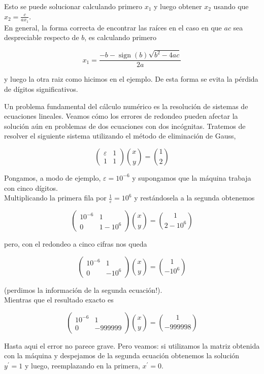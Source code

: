\documentclass[10pt]{book}
\begin{document}
Esto se puede solucionar calculando primero $x_{1}$ y luego obtener $x_{2}$ usando que $x_{2}=\frac{c}{a x_{1}}$.\\
En general, la forma correcta de encontrar las raíces en el caso en que $a c$ sea despreciable respecto de $b$, es calculando primero

$$
x_{1}=\frac{-b-\operatorname{sign}(b) \sqrt{b^{2}-4 a c}}{2 a}
$$

y luego la otra raiz como hicimos en el ejemplo. De esta forma se evita la pérdida de dígitos significativos.

Un problema fundamental del cálculo numérico es la resolución de sistemas de ecuaciones lineales. Veamos cómo los errores de redondeo pueden afectar la solución aún en problemas de dos ecuaciones con dos incógnitas. Tratemos de resolver el siguiente sistema utilizando el método de eliminación de Gauss,

$$
\left(\begin{array}{ll}
\varepsilon & 1 \\
1 & 1
\end{array}\right)\binom{x}{y}=\binom{1}{2}
$$

Pongamos, a modo de ejemplo, $\varepsilon=10^{-6}$ y supongamos que la máquina trabaja con cinco dígitos.\\
Multiplicando la primera fila por $\frac{1}{\varepsilon}=10^{6}$ y restándosela a la segunda obtenemos

$$
\left(\begin{array}{cc}
10^{-6} & 1 \\
0 & 1-10^{6}
\end{array}\right)\binom{x}{y}=\binom{1}{2-10^{6}}
$$

pero, con el redondeo a cinco cifras nos queda

$$
\left(\begin{array}{cc}
10^{-6} & 1 \\
0 & -10^{6}
\end{array}\right)\binom{x}{y}=\binom{1}{-10^{6}}
$$

(perdimos la información de la segunda ecuación!).\\
Mientras que el resultado exacto es

$$
\left(\begin{array}{cc}
10^{-6} & 1 \\
0 & -999999
\end{array}\right)\binom{x}{y}=\binom{1}{-999998}
$$

Hasta aqui el error no parece grave. Pero veamos: si utilizamos la matriz obtenida con la máquina y despejamos de la segunda ecuación obtenemos la solución $y^{\prime}=1$ y luego, reemplazando en la primera, $x^{\prime}=0$.
\end{document}

